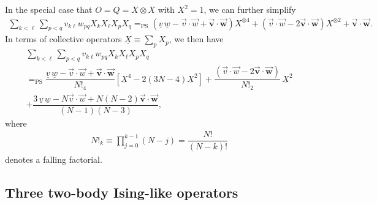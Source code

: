 \documentclass[nofootinbib,notitlepage,11pt]{revtex4-2}
\newcommand{\f}[2]{\dfrac{#1}{#2}} %
\newcommand{\p}[1]{\left(#1\right)} %
\renewcommand{\sp}[1]{\left[#1\right]} %
\renewcommand{\c}{\cdot} %
\newcommand{\m}{\bm} %
\renewcommand{\v}{\vec} %
\newcommand{\1}{\mathds{1}}
\newcommand{\EQPS}{=_{\text{PS}}}
\newcommand{\col}{\underline}
\begin{document}
In the special case that $O=Q=X\otimes X$ with $X^2=1$, we can further
simplify
\begin{align}
  \sum_{k<\ell} \sum_{p<q} v_{k\ell} w_{pq} X_k X_\ell X_p X_q
  \EQPS
  \p{\col{v}\,\col{w} -\v v\c\v w + \v{\m v}\c\v{\m w}} X^{\otimes 4}
  + \p{\v v\c\v w - 2 \v{\m v} \c \v{\m w}} X^{\otimes 2}
  + \v{\m v}\c\v{\m w}.
\end{align}
In terms of collective operators $\col{X} \equiv \sum_p X_p$, we then
have
\begin{multline}
  \sum_{k<\ell} \sum_{p<q} v_{k\ell} w_{pq} X_k X_\ell X_p X_q \\
  \EQPS
  \f{\col{v}\,\col{w} -\v v\c\v w + \v{\m v}\c\v{\m w}}{N!_4}
  \sp{\col{X}^4 - 2\p{3N-4} \col{X}^2}
  + \f{\p{\v v\c\v w - 2 \v{\m v} \c \v{\m w}}}{N!_2}\, \col{X}^2 \\
  + \f{3\,\col{v}\,\col{w} - N \v v\c\v w
    + N\p{N-2}\v{\m v}\c\v{\m w}}{\p{N-1}\p{N-3}},
\end{multline}
where
\begin{align}
  N!_k \equiv \prod_{j=0}^{k-1} \p{N-j} = \f{N!}{\p{N-k}!}
\end{align}
denotes a falling factorial.

\subsection{Three two-body Ising-like operators}
\end{document}
